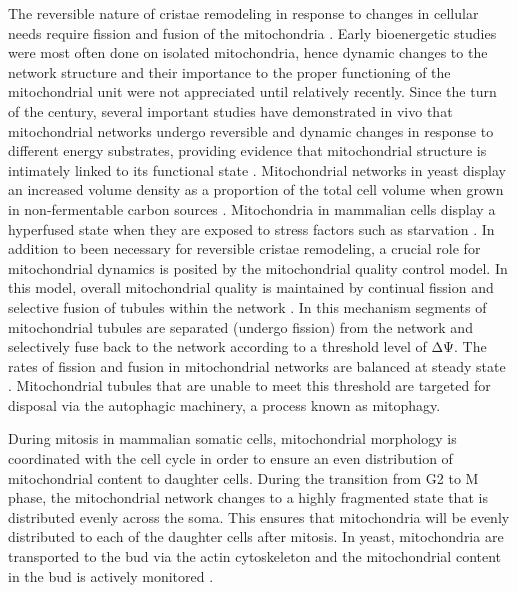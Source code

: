 The reversible nature of cristae remodeling in response to changes in cellular needs require fission and fusion of the mitochondria \cite{mannella_topology_2001}. Early bioenergetic studies were most often done on isolated mitochondria, hence dynamic changes to the network structure and their importance to the proper functioning of the mitochondrial unit were not appreciated until relatively recently. Since the turn of the century, several important studies have demonstrated in vivo that mitochondrial networks undergo reversible and dynamic changes in response to different energy substrates, providing evidence that mitochondrial structure is intimately linked to its functional state \cite{amchenkova_coupling_1988, jakobs_spatial_2003, meeusen_mitochondrial_2004, rossignol_energy_2004}. Mitochondrial networks in yeast display an increased volume density as a proportion of the total cell volume when grown in non-fermentable carbon sources \cite{stevens_mitochondrial_1981}. Mitochondria in mammalian cells display a hyperfused state when they are exposed to stress factors such as starvation \cite{tondera_slp-2_2009}. In addition to been necessary for reversible cristae remodeling, a crucial role for mitochondrial dynamics is posited by the mitochondrial quality control model. In this model, overall mitochondrial quality is maintained by continual fission and selective fusion of tubules within the network \cite{twig_fission_2008}. In this mechanism segments of mitochondrial tubules are separated (undergo fission) from the network and selectively fuse back to the network according to a threshold level of ΔΨ. The rates of fission and fusion in mitochondrial networks are balanced at steady state \cite{shaw_mitochondrial_2002}. Mitochondrial tubules that are unable to meet this threshold are targeted for disposal via the autophagic machinery, a process known as mitophagy.

During mitosis in mammalian somatic cells, mitochondrial morphology is coordinated with the cell cycle in order to ensure an even distribution of mitochondrial content to daughter cells. During the transition from G2 to M phase, the mitochondrial network changes to a highly fragmented state that is distributed evenly across the soma. This ensures that mitochondria will be evenly distributed to each of the daughter cells after mitosis. In yeast, mitochondria are transported to the bud via the actin cytoskeleton and the mitochondrial content in the bud is actively monitored \cite{rafelski_mitochondrial_2012}.
